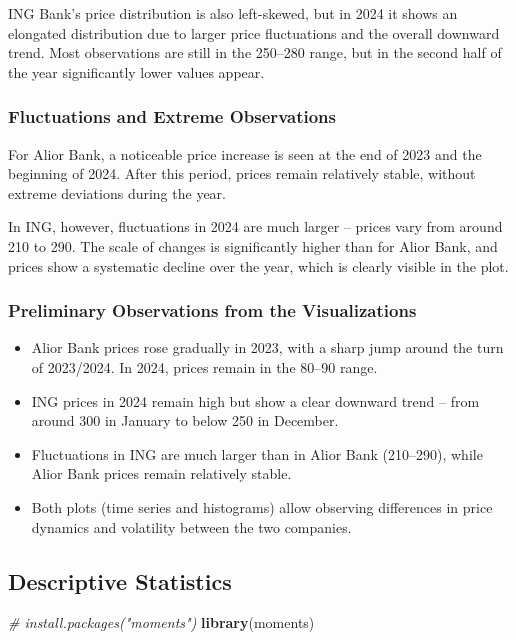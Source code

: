 \documentclass[
]{article}
\newenvironment{Shaded}{\begin{snugshade}}{\end{snugshade}}
\newcommand{\CommentTok}[1]{\textcolor[rgb]{0.56,0.35,0.01}{\textit{#1}}}
\newcommand{\FunctionTok}[1]{\textcolor[rgb]{0.13,0.29,0.53}{\textbf{#1}}}
\newcommand{\NormalTok}[1]{#1}
\begin{document}
ING Bank's price distribution is also left-skewed, but in 2024 it shows
an elongated distribution due to larger price fluctuations and the
overall downward trend. Most observations are still in the 250--280
range, but in the second half of the year significantly lower values
appear.

\subsubsection{Fluctuations and Extreme
Observations}\label{fluctuations-and-extreme-observations}

For Alior Bank, a noticeable price increase is seen at the end of 2023
and the beginning of 2024. After this period, prices remain relatively
stable, without extreme deviations during the year.

In ING, however, fluctuations in 2024 are much larger -- prices vary
from around 210 to 290. The scale of changes is significantly higher
than for Alior Bank, and prices show a systematic decline over the year,
which is clearly visible in the plot.

\subsubsection{Preliminary Observations from the
Visualizations}\label{preliminary-observations-from-the-visualizations}

\begin{itemize}
\item
  Alior Bank prices rose gradually in 2023, with a sharp jump around the
  turn of 2023/2024. In 2024, prices remain in the 80--90 range.
\item
  ING prices in 2024 remain high but show a clear downward trend -- from
  around 300 in January to below 250 in December.
\item
  Fluctuations in ING are much larger than in Alior Bank (210--290),
  while Alior Bank prices remain relatively stable.
\item
  Both plots (time series and histograms) allow observing differences in
  price dynamics and volatility between the two companies.
\end{itemize}

\subsection{Descriptive Statistics}\label{descriptive-statistics}

\begin{Shaded}
\begin{Highlighting}[]
\CommentTok{\# install.packages("moments")}
\FunctionTok{library}\NormalTok{(moments)}
\end{Highlighting}
\end{Shaded}
\end{document}
